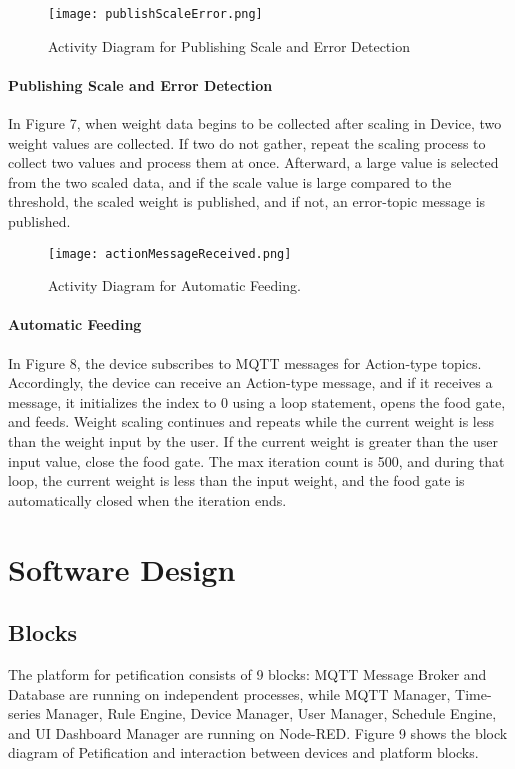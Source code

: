 \documentclass[conference]{IEEEtran}
\begin{document}
\begin{figure}[htbp]
\centerline{\texttt{[image: publishScaleError.png]}}
\caption{Activity Diagram for Publishing Scale and Error Detection}
\label{fig}
\end{figure}

\paragraph{Publishing Scale and Error Detection}
In Figure 7, when weight data begins to be collected after scaling in Device, two weight values are collected. If two do not gather, repeat the scaling process to collect two values and process them at once. Afterward, a large value is selected from the two scaled data, and if the scale value is large compared to the threshold, the scaled weight is published, and if not, an error-topic message is published.

\begin{figure}[htbp!]
\centerline{\texttt{[image: actionMessageReceived.png]}}
\caption{Activity Diagram for Automatic Feeding.}
\label{fig} 
\end{figure}

\paragraph{Automatic Feeding}
In Figure 8, the device subscribes to MQTT messages for Action-type topics.
Accordingly, the device can receive an Action-type message, and if it receives a message, it initializes the index to 0 using a loop statement, opens the food gate, and feeds.
Weight scaling continues and repeats while the current weight is less than the weight input by the user.
If the current weight is greater than the user input value, close the food gate.
The max iteration count is 500, and during that loop, the current weight is less than the input weight, and the food gate is automatically closed when the iteration ends.

\section{Software Design}
\subsection{Blocks}
The platform for petification consists of 9 blocks: MQTT Message Broker and Database are running on independent processes, while MQTT Manager, Time-series Manager, Rule Engine, Device Manager, User Manager, Schedule Engine, and UI Dashboard Manager are running on Node-RED. Figure 9
shows the block diagram of Petification and interaction between devices and platform blocks.
\end{document}
